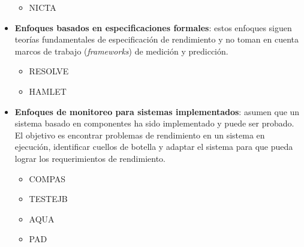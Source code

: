 \begin{itemize}
    \begin{itemize}
        \item NICTA
    \end{itemize}
    \item \textbf{Enfoques basados en especificaciones formales}: estos enfoques siguen teorías fundamentales de especificación de rendimiento y no toman en cuenta marcos de trabajo (\emph{frameworks}) de medición y predicción.
    \begin{itemize}
        \item RESOLVE
        \item HAMLET
    \end{itemize}
    \item \textbf{Enfoques de monitoreo para sistemas implementados}: asumen que un sistema basado en componentes ha sido implementado y puede ser probado. El objetivo es encontrar problemas de rendimiento en un sistema en ejecución, identificar cuellos de botella y adaptar el sistema para que pueda lograr los requerimientos de rendimiento.
   \begin{itemize}
        \item COMPAS
        \item TESTEJB
        \item AQUA
        \item PAD
    \end{itemize}    
\end{itemize}
  


